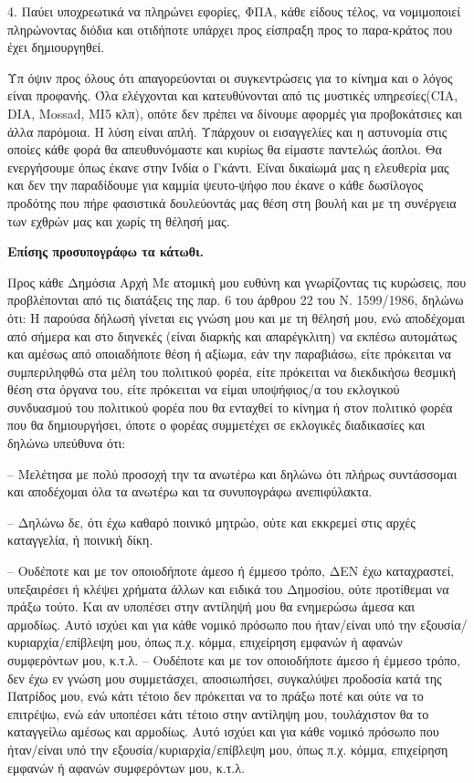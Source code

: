 \documentclass[a4paper]{article}
\begin{document}
4. Παύει υποχρεωτικά να πληρώνει εφορίες, ΦΠΑ, κάθε είδους τέλος, να νομιμοποιεί πληρώνοντας διόδια και οτιδήποτε υπάρχει προς είσπραξη προς το παρα-κράτος που έχει δημιουργηθεί.

Υπ όψιν προς όλους ότι απαγορεύονται οι συγκεντρώσεις για το κίνημα και ο λόγος είναι προφανής. Όλα ελέγχονται και κατευθύνονται από τις μυστικές υπηρεσίες(CIA, DIA, Mossad, MI5 κλπ), οπότε δεν πρέπει να δίνουμε αφορμές για προβοκάτσιες και άλλα παρόμοια. Η λύση είναι απλή. Υπάρχουν οι εισαγγελίες και η αστυνομία στις οποίες κάθε φορά θα απευθυνόμαστε και κυρίως θα είμαστε παντελώς άοπλοι. Θα ενεργήσουμε όπως έκανε στην Ινδία ο Γκάντι. Είναι δικαίωμά μας η ελευθερία μας και δεν την παραδίδουμε για καμμία ψευτο-ψήφο  που έκανε ο κάθε δωσίλογος προδότης που πήρε φασιστικά δουλεύοντάς μας θέση στη βουλή και με τη συνέργεια των εχθρών μας και χωρίς τη θέλησή μας.

\textbf{Επίσης προσυπογράφω τα κάτωθι.}

Προς κάθε Δημόσια Αρχή Με ατομική μου ευθύνη και γνωρίζοντας τις κυρώσεις, που προβλέπονται από τις διατάξεις της παρ. 6 του άρθρου 22 του Ν. 1599/1986, δηλώνω ότι: Η παρούσα δήλωσή γίνεται εις γνώση μου και με τη θέλησή μου, ενώ αποδέχομαι από σήμερα και στο διηνεκές (είναι διαρκής και απαρέγκλιτη) να εκπέσω αυτομάτως και αμέσως από οποιαδήποτε θέση ή αξίωμα, εάν την παραβιάσω, είτε πρόκειται να συμπεριληφθώ στα μέλη του πολιτικού φορέα, είτε πρόκειται να διεκδικήσω θεσμική θέση στα όργανα του, είτε πρόκειται να είμαι υποψήφιος/α του εκλογικού συνδυασμού του πολιτικού φορέα που θα ενταχθεί το κίνημα ή στον πολιτικό φορέα που θα δημιουργήσει, όποτε ο φορέας συμμετέχει σε εκλογικές διαδικασίες και δηλώνω υπεύθυνα ότι:

– Μελέτησα με πολύ προσοχή την τα ανωτέρω και δηλώνω ότι πλήρως συντάσσομαι και αποδέχομαι όλα τα ανωτέρω και τα συνυπογράφω ανεπιφύλακτα.

– Δηλώνω δε, ότι έχω καθαρό ποινικό μητρώο, ούτε και εκκρεμεί στις αρχές καταγγελία, ή ποινική δίκη. 

– Ουδέποτε και με τον οποιοδήποτε άμεσο ή έμμεσο τρόπο, ΔΕΝ έχω καταχραστεί, υπεξαιρέσει ή κλέψει χρήματα άλλων και ειδικά του Δημοσίου, ούτε προτίθεμαι να πράξω τούτο. Και αν υποπέσει στην αντίληψή μου θα ενημερώσω άμεσα και αρμοδίως. Αυτό ισχύει και για κάθε νομικό πρόσωπο που ήταν/είναι υπό την εξουσία/κυριαρχία/επίβλεψη μου, όπως π.χ. κόμμα, επιχείρηση εμφανών ή αφανών συμφερόντων μου, κ.τ.λ. – Ουδέποτε και με τον οποιοδήποτε άμεσο ή έμμεσο τρόπο, δεν έχω εν γνώση μου συμμετάσχει, αποσιωπήσει, συγκαλύψει προδοσία κατά της Πατρίδος μου, ενώ κάτι τέτοιο δεν πρόκειται να το πράξω ποτέ και ούτε να το επιτρέψω, ενώ εάν υποπέσει κάτι τέτοιο στην αντίληψη μου, τουλάχιστον θα το καταγγείλω αμέσως και αρμοδίως. Αυτό ισχύει και για κάθε νομικό πρόσωπο που ήταν/είναι υπό την εξουσία/κυριαρχία/επίβλεψη μου, όπως π.χ. κόμμα, επιχείρηση εμφανών ή αφανών συμφερόντων μου, κ.τ.λ.
\end{document}
